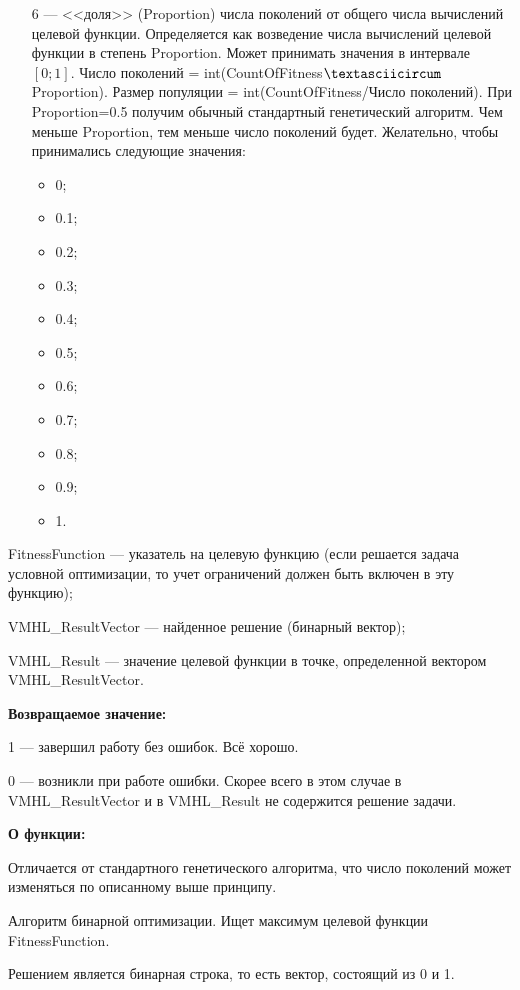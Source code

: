 \documentclass[a4paper,12pt]{article}
\begin{document}
\begin{itemize}
 \item [6] --- <<доля>> (Proportion) числа поколений от общего числа вычислений целевой функции. Определяется как возведение числа вычислений целевой функции в степень Proportion. Может принимать значения в интервале $[0;1]$. Число поколений = int(CountOfFitness$\textasciicircum$Proportion). Размер популяции = int(CountOfFitness/Число поколений). При Proportion=0.5 получим обычный стандартный генетический алгоритм. Чем меньше Proportion, тем меньше число поколений будет. Желательно, чтобы принимались следующие значения:
  \begin{itemize}
       \item 0;
	   \item 0.1;
	   \item 0.2;
	   \item 0.3;
	   \item 0.4;
	   \item 0.5;
	   \item 0.6;
	   \item 0.7;
	   \item 0.8;
	   \item 0.9; 
       \item 1.
	    \end{itemize}
 \end{itemize}
 
FitnessFunction --- указатель на целевую функцию (если решается задача условной оптимизации, то учет ограничений должен быть включен в эту функцию);
 
VMHL\_ResultVector --- найденное решение (бинарный вектор);
 
VMHL\_Result --- значение целевой функции в точке, определенной вектором VMHL\_ResultVector.

\textbf{Возвращаемое значение:} 

 1 --- завершил работу без ошибок. Всё хорошо.
 
 0 --- возникли при работе ошибки. Скорее всего в этом случае в VMHL\_ResultVector и в VMHL\_Result не содержится решение задачи.

 
\textbf{О функции:}

Отличается от стандартного генетического алгоритма, что число поколений может изменяться по описанному выше принципу.

Алгоритм бинарной оптимизации. Ищет максимум целевой функции FitnessFunction.

Решением является бинарная строка, то есть вектор, состоящий из 0 и 1.
\end{document}

